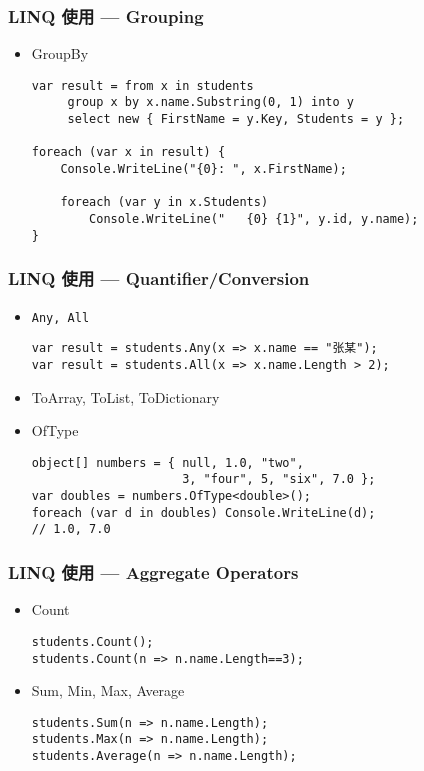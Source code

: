\begin{frame}[fragile]
\frametitle{LINQ 使用 --- Grouping}
\begin{itemize}
\item GroupBy
\begin{lstlisting}
var result = from x in students
     group x by x.name.Substring(0, 1) into y
     select new { FirstName = y.Key, Students = y };

foreach (var x in result) {
    Console.WriteLine("{0}: ", x.FirstName);

    foreach (var y in x.Students)
        Console.WriteLine("   {0} {1}", y.id, y.name);
}
\end{lstlisting}
\end{itemize}
\end{frame}


\begin{frame}[fragile]
\frametitle{LINQ 使用 --- Quantifier/Conversion}
\begin{itemize}
\item \texttt{Any, All}
\begin{lstlisting}
var result = students.Any(x => x.name == "张某");
var result = students.All(x => x.name.Length > 2);
\end{lstlisting}
\item ToArray, ToList, ToDictionary
\item OfType
\begin{lstlisting}
object[] numbers = { null, 1.0, "two", 
                     3, "four", 5, "six", 7.0 }; 
var doubles = numbers.OfType<double>(); 
foreach (var d in doubles) Console.WriteLine(d); 
// 1.0, 7.0
\end{lstlisting}
\end{itemize}
\end{frame}



\begin{frame}[fragile]
\frametitle{LINQ 使用 --- Aggregate Operators}
\begin{itemize}
\item Count
\begin{lstlisting}
students.Count();
students.Count(n => n.name.Length==3);
\end{lstlisting}
\item Sum, Min, Max, Average
\begin{lstlisting}
students.Sum(n => n.name.Length);
students.Max(n => n.name.Length);
students.Average(n => n.name.Length);
\end{lstlisting}
\end{itemize}
\end{frame}


